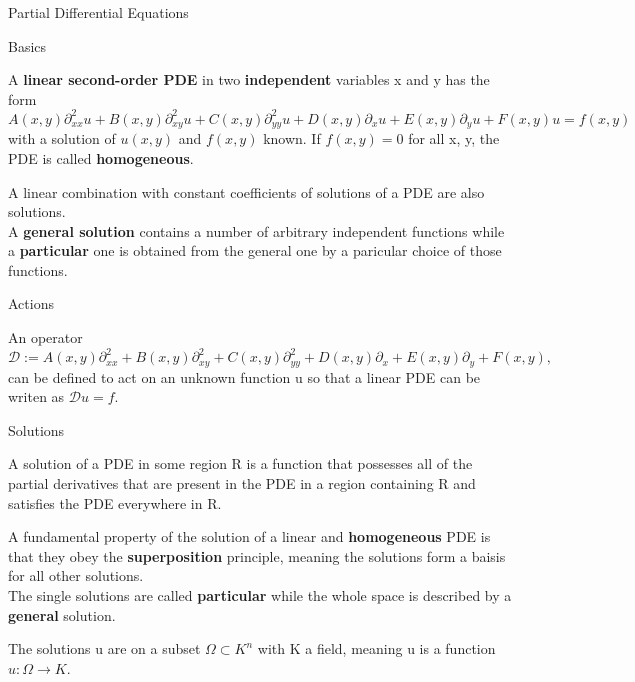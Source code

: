 \documentclass[12pt, letterpaper]{article}
\begin{document}
\begin{section}{Partial Differential Equations}

  \begin{subsection}{Basics}

    A \textbf{linear second-order PDE} in two \textbf{independent} variables x
    and y has the form \[
      A(x, y) \partial^{2}_{xx} u +B(x, y) \partial^{2}_{xy} u +
      C(x, y) \partial^{2}_{yy} u + D(x, y) \partial_{x} u +
      E(x, y) \partial_{y} u + F(x, y) u = f(x, y)\]
    with a solution of \(u(x, y)\) and \(f(x, y)\) known. If \(f(x, y) = 0\) for
    all x, y, the PDE is called \textbf{homogeneous}.

    A linear combination with constant coefficients of solutions of a PDE are
    also solutions. \\
    A \textbf{general solution} contains a number of arbitrary independent
    functions while a \textbf{particular} one is obtained from the general one
    by a paricular choice of those functions.

    \begin{subsubsection}{Actions}

      An operator \[\mathcal{D} :=
        A(x, y) \partial^{2}_{xx} +B(x, y) \partial^{2}_{xy} +
        C(x, y) \partial^{2}_{yy} + D(x, y) \partial_{x} +
        E(x, y) \partial_{y} + F(x, y),\] can be defined to act on an unknown
      function u so that a linear PDE can be writen as \(\mathcal{D}u = f\).

    \end{subsubsection}

    \begin{subsubsection}{Solutions}

      A solution of a PDE in some region R is a function that possesses all of
      the partial derivatives that are present in the PDE in a region containing
      R and satisfies the PDE everywhere in R.

      A fundamental property of the solution of a linear and
      \textbf{homogeneous} PDE is that they obey the \textbf{superposition}
      principle, meaning the solutions form a baisis for all other solutions. \\
      The single solutions are called \textbf{particular} while the whole space
      is described by a \textbf{general} solution.

      The solutions u are on a subset \(\Omega \subset K^{n}\) with K a field,
      meaning u is a function \(u: \Omega \to K\).


\end{subsubsection}
\end{subsection}
\end{section}
\end{document}
